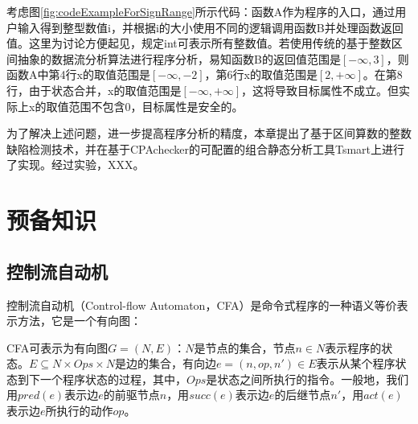 考虑图\ref{fig:codeExampleForSignRange}所示代码：函数A作为程序的入口，通过用户输入得到整型数值i，并根据i的大小使用不同的逻辑调用函数B并处理函数返回值。这里为讨论方便起见，规定int可表示所有整数值。若使用传统的基于整数区间抽象的数据流分析算法进行程序分析，易知函数B的返回值范围是$ [-\infty, 3] $，则函数A中第4行x的取值范围是$ [-\infty, -2] $，第6行x的取值范围是$ [2, +\infty] $。在第8行，由于状态合并，x的取值范围是$ [-\infty, +\infty] $，这将导致目标属性不成立。但实际上x的取值范围不包含0，目标属性是安全的。

为了解决上述问题，进一步提高程序分析的精度，本章提出了基于区间算数的整数缺陷检测技术，并在基于CPAchecker\cite{beyer2007configurable}的可配置的组合静态分析工具Tsmart上进行了实现。经过实验，XXX。

\section{预备知识}

%

\subsection{控制流自动机}
\label{sec:控制流自动机}

控制流自动机（Control-flow Automaton，CFA）是命令式程序的一种语义等价表示方法，它是一个有向图：
\begin{definition}
	CFA可表示为有向图$ G = (N, E) $：$ N $是节点的集合，节点$ n \in N $表示程序的状态。$ E \subseteq N \times Ops \times N $是边的集合，有向边$ e = (n, op, n') \in E $表示从某个程序状态到下一个程序状态的过程，其中，$ Ops $是状态之间所执行的指令。一般地，我们用$ pred(e) $表示边$ e $的前驱节点$ n $，用$ succ(e) $表示边$ e $的后继节点$ n' $，用$ act(e) $表示边$ e $所执行的动作$ op $。
\end{definition}

